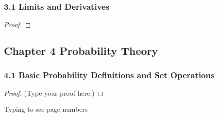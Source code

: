 \documentclass[12pt]{article}
\begin{document}
\subsubsection*{3.1 Limits and Derivatives}
\begin{proof}
\end{proof}
\subsection*{Chapter 4 Probability Theory}
\subsubsection*{4.1 Basic Probability Definitions and Set Operations}
\begin{proof}
(Type your proof here.)
\end{proof}
\vspace{2in} %
\vspace{3in}
Typing to see page numbers
\end{document}
